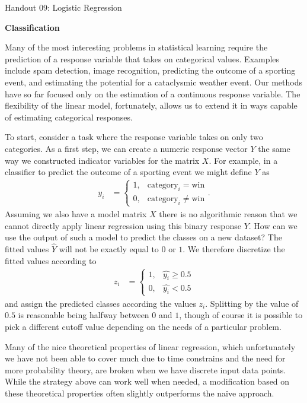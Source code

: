 \documentclass[12pt,hidelinks]{article}
\numberwithin{equation}{section}
\begin{document}
{\LARGE Handout 09: Logistic Regression}

\vspace*{18pt}

\textbf{Classification}

Many of the most interesting problems in statistical learning
require the prediction of a response variable that takes on
categorical values. Examples include spam detection, image
recognition, predicting the outcome of a sporting event, and
estimating the potential for a cataclysmic weather event. Our
methods have so far focused only on the estimation of a
continuous response variable. The flexibility of the linear
model, fortunately, allows us to extend it in ways
capable of estimating categorical responses.

To start, consider a task where the response variable takes
on only two categories. As a first step, we can create a numeric
response vector $Y$ the same way we constructed indicator
variables for the matrix $X$. For example, in a classifier to
predict the outcome of a sporting event we might define $Y$ as
\begin{align}
y_i &= \begin{cases} 1, & \text{category}_i =
   \text{win} \\ 0, & \text{category}_i \neq \text{win} \end{cases}.
\end{align}
Assuming we also have a model matrix $X$ there is no algorithmic
reason that we cannot directly apply linear regression using this
binary response $Y$.
How can we use the output of such a model to predict the classes
on a new dataset? The fitted values $\widehat{Y}$ will not be
exactly equal to $0$ or $1$. We therefore discretize the fitted
values according to
\begin{align}
z_i &= \begin{cases} 1, & \widehat{y_i} \geq 0.5 \\
 0, & \widehat{y_i} < 0.5 \end{cases} \label{disc_response}
\end{align}
and assign the predicted classes according the values $z_i$.
Splitting by the value of $0.5$ is reasonable being halfway
between $0$ and $1$, though of course it is possible to pick a
different cutoff value depending on the needs of a particular
problem.

Many of the nice theoretical properties of linear regression,
which unfortunately we have not been able to cover much due
to time constrains and the need for more probability theory,
are broken when we have discrete input data points. While the
strategy above can work well when needed, a modification based
on these theoretical properties often slightly outperforms the
naïve approach.
\end{document}
